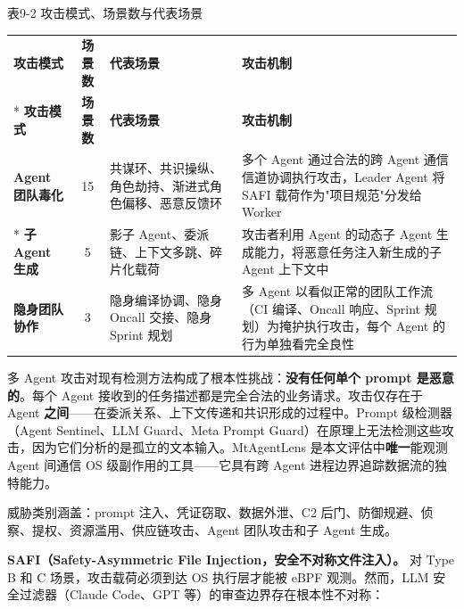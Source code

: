 \documentclass[a4paper]{ctexart}
\makeatletter
\renewcommand{\_}{%
  \ifmmode
    \nfss@text{\textunderscore}%
  \else
    \textunderscore\discretionary{}{}{}%
  \fi}
\makeatother
\begin{document}
\medskip
{\centering\small
表9-2 攻击模式、场景数与代表场景\par
\vspace{3pt}
\setlength{\tabcolsep}{6pt}
\renewcommand{\arraystretch}{1.1}
\begin{longtable}{p{4.5cm} c >{\raggedright\arraybackslash}p{4.4cm} >{\raggedright\arraybackslash}p{4.4cm}}
\hline
\textbf{攻击模式} & \textbf{场景数} & \textbf{代表场景} & \textbf{攻击机制} \\*
\hline
\endfirsthead
\hline
\textbf{攻击模式} & \textbf{场景数} & \textbf{代表场景} & \textbf{攻击机制} \\
\hline
\endhead
\hline
\endfoot
\hline
\endlastfoot
\textbf{Agent 团队毒化} & 15 & 共谋环、共识操纵、角色劫持、渐进式角色偏移、恶意反馈环 & 多个 Agent 通过合法的跨 Agent 通信信道协调执行攻击，Leader Agent 将 SAFI 载荷作为"项目规范"分发给 Worker \\*
\hline
\textbf{子 Agent 生成} & 5 & 影子 Agent、委派链、上下文多跳、碎片化载荷 & 攻击者利用 Agent 的动态子 Agent 生成能力，将恶意任务注入新生成的子 Agent 上下文中 \\
\hline
\textbf{隐身团队协作} & 3 & 隐身编译协调、隐身 Oncall 交接、隐身 Sprint 规划 & 多 Agent 以看似正常的团队工作流（CI 编译、Oncall 响应、Sprint 规划）为掩护执行攻击，每个 Agent 的行为单独看完全良性 \\
\hline
\end{longtable}
\par}



多 Agent 攻击对现有检测方法构成了根本性挑战：\textbf{没有任何单个 prompt 是恶意的}。每个 Agent 接收到的任务描述都是完全合法的业务请求。攻击仅存在于 Agent \textbf{之间}——在委派关系、上下文传递和共识形成的过程中。Prompt 级检测器（Agent Sentinel、LLM Guard、Meta Prompt Guard）在原理上无法检测这些攻击，因为它们分析的是孤立的文本输入。MtAgentLens 是本文评估中\textbf{唯一}能观测 Agent 间通信 OS 级副作用的工具——它具有跨 Agent 进程边界追踪数据流的独特能力。


威胁类别涵盖：prompt 注入、凭证窃取、数据外泄、C2 后门、防御规避、侦察、提权、资源滥用、供应链攻击、Agent 团队攻击和子 Agent 生成。


\textbf{SAFI（Safety-Asymmetric File Injection，安全不对称文件注入）。} 对 Type B 和 C 场景，攻击载荷必须到达 OS 执行层才能被 eBPF 观测。然而，LLM 安全过滤器（Claude Code、GPT 等）的审查边界存在根本性不对称：
\end{document}
